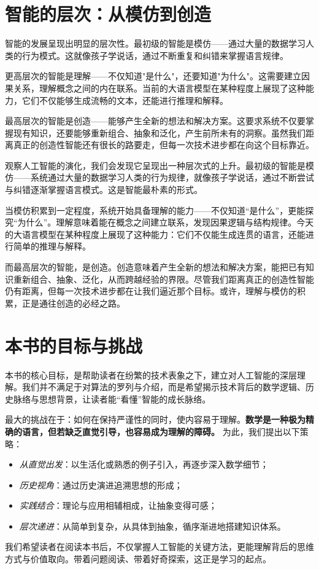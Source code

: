 \section{智能的层次：从模仿到创造}
智能的发展呈现出明显的层次性。最初级的智能是模仿——通过大量的数据学习人类的行为模式。这就像孩子学说话，通过不断重复和纠错来掌握语言规律。

更高层次的智能是理解——不仅知道"是什么"，还要知道"为什么"。这需要建立因果关系，理解概念之间的内在联系。当前的大语言模型在某种程度上展现了这种能力，它们不仅能够生成流畅的文本，还能进行推理和解释。

最高层次的智能是创造——能够产生全新的想法和解决方案。这要求系统不仅要掌握现有知识，还要能够重新组合、抽象和泛化，产生前所未有的洞察。虽然我们距离真正的创造性智能还有很长的路要走，但每一次技术进步都在向这个目标靠近。


观察人工智能的演化，我们会发现它呈现出一种层次式的上升。最初级的智能是模仿——系统通过大量的数据学习人类的行为规律，就像孩子学说话，通过不断尝试与纠错逐渐掌握语言模式。这是智能最朴素的形式。

当模仿积累到一定程度，系统开始具备理解的能力——不仅知道“是什么”，更能探究“为什么”。理解意味着能在概念之间建立联系，发现因果逻辑与结构规律。今天的大语言模型在某种程度上展现了这种能力：它们不仅能生成连贯的语言，还能进行简单的推理与解释。

而最高层次的智能，是创造。创造意味着产生全新的想法和解决方案，能把已有知识重新组合、抽象、泛化，从而跨越经验的界限。尽管我们距离真正的创造性智能仍有距离，但每一次技术进步都在让我们逼近那个目标。或许，理解与模仿的积累，正是通往创造的必经之路。

\section{本书的目标与挑战}

本书的核心目标，是帮助读者在纷繁的技术表象之下，建立对人工智能的深层理解。我们并不满足于对算法的罗列与介绍，而是希望揭示技术背后的数学逻辑、历史脉络与思想背景，让读者能“看懂”智能的成长脉络。

最大的挑战在于：如何在保持严谨性的同时，使内容易于理解。{\bf 数学是一种极为精确的语言，但若缺乏直觉引导，也容易成为理解的障碍。}
为此，我们提出以下策略：
\begin{itemize}
\item \emph{从直觉出发}：以生活化或熟悉的例子引入，再逐步深入数学细节；
\item \emph{历史视角}：通过历史演进追溯思想的形成；
\item \emph{实践结合}：理论与应用相辅相成，让抽象变得可感；
\item \emph{层次递进}：从简单到复杂，从具体到抽象，循序渐进地搭建知识体系。
\end{itemize}

我们希望读者在阅读本书后，不仅掌握人工智能的关键方法，更能理解背后的思维方式与价值取向。带着问题阅读、带着好奇探索，这正是学习的起点。

\newpage